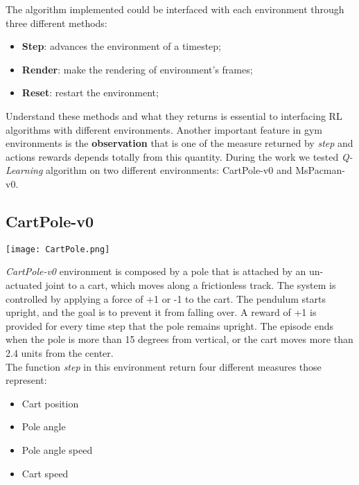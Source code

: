 \documentclass[]{report}
\begin{document}
The algorithm implemented could be interfaced with each environment through three different methods:
\begin{itemize}
	\item \textbf{Step}: advances the environment of a timestep;
	\item \textbf{Render}: make the rendering of environment's frames;
	\item \textbf{Reset}: restart the environment;
\end{itemize}

Understand these methods and what they returns is essential to interfacing RL algorithms with different environments.
Another important feature in gym environments is the \textbf{observation} that is one of the measure returned by \emph{step} and actions rewards depends totally from this quantity.
During the work we tested \emph{Q-Learning} algorithm on two different environments: CartPole-v0 and MsPacman-v0.

\subsection{CartPole-v0}
\vspace{1ex}
\begin{center}
	\texttt{[image: CartPole.png]}
\end{center}
\vspace{2ex}

\emph{CartPole-v0} environment is composed by a pole that is attached by an un-actuated joint to a cart, which moves along a frictionless track. The system is controlled by applying a force of +1 or -1 to the cart. The pendulum starts upright, and the goal is to prevent it from falling over. A reward of +1 is provided for every time step that the pole remains upright. The episode ends when the pole is more than 15 degrees from vertical, or the cart moves more than 2.4 units from the center.\\
The function \emph{step} in this environment return four different measures those represent:
\begin{itemize}
	\item Cart position
	\item Pole angle
	\item Pole angle speed
	\item Cart speed
\end{itemize}
\end{document}
